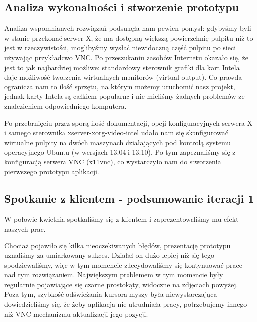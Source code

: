   \subsection{Analiza wykonalności i stworzenie prototypu}
    Analiza wspomnianych rozwiązań podsunęła nam pewien pomysł: gdybyśmy byli w stanie przekonać serwer X, że ma dostępną większą powierzchnię pulpitu niż to jest w rzeczywistości, moglibyśmy wysłać niewidoczną część pulpitu po sieci używając przykładowo VNC. Po przeszukaniu zasobów Internetu okazało się, że jest to jak najbardziej możliwe: standardowy sterownik grafiki dla kart Intela daje możliwość tworzenia wirtualnych monitorów (virtual output). Co prawda ogranicza nam to ilość sprzętu, na którym możemy uruchomić nasz projekt, jednak karty Intela są całkiem popularne i nie mieliśmy żadnych problemów ze znalezieniem odpowiedniego komputera.

    Po przebrnięciu przez sporą ilość dokumentacji, opcji konfiguracyjnych serwera X i samego sterownika xserver-xorg-video-intel udało nam się skonfigurować wirtualne pulpity na dwóch maszynach działających pod kontrolą systemu operacyjnego Ubuntu (w wersjach 13.04 i 13.10). Po tym zapoznaliśmy się z konfiguracją serwera VNC (x11vnc), co wystarczyło nam do stworzenia pierwszego prototypu aplikacji.

  \subsection{Spotkanie z klientem - podsumowanie iteracji 1}
    W połowie kwietnia spotkaliśmy się z klientem i zaprezentowaliśmy mu efekt naszych prac.

    Chociaż pojawiło się kilka nieoczekiwanych błędów, prezentację prototypu uznaliśmy za umiarkowany sukces. Działał on dużo lepiej niż się tego spodziewaliśmy, więc w tym momencie zdecydowaliśmy się kontynuować prace nad tym rozwiązaniem. Największym problemem w tym momencie były regularnie pojawiające się czarne prostokąty, widoczne na zdjęciach powyżej. Poza tym, szybkość odświeżania kursora myszy była niewystarczająca - dowiedzieliśmy się, że żeby aplikacja nie utrudniała pracy, potrzebujemy innego niż VNC mechanizmu aktualizacji jego pozycji.

    \vfill
    \pagebreak

